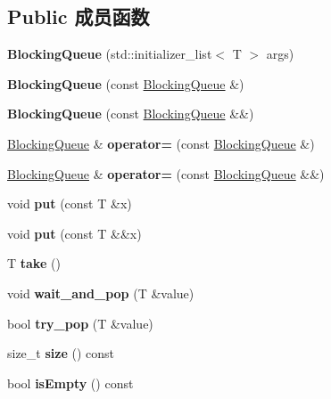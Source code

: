 \subsection*{Public 成员函数}
\begin{DoxyCompactItemize}
\item 
\mbox{\label{classBlockingQueue_a4d1bbabd0a1212ab77b3a24614b6b0c1}} 
{\bfseries Blocking\+Queue} (std\+::initializer\+\_\+list$<$ T $>$ args)
\item 
\mbox{\label{classBlockingQueue_a2f2b1e4d887d77a81fddabd44c5cdbfd}} 
{\bfseries Blocking\+Queue} (const \hyperlink{classBlockingQueue}{Blocking\+Queue} \&)
\item 
\mbox{\label{classBlockingQueue_ab7dbc308989dda7bef2f884a2703c806}} 
{\bfseries Blocking\+Queue} (const \hyperlink{classBlockingQueue}{Blocking\+Queue} \&\&)
\item 
\mbox{\label{classBlockingQueue_aaee07bb9044a01b4cb0af75748795325}} 
\hyperlink{classBlockingQueue}{Blocking\+Queue} \& {\bfseries operator=} (const \hyperlink{classBlockingQueue}{Blocking\+Queue} \&)
\item 
\mbox{\label{classBlockingQueue_abbe4440d6ed06d175925bba1f3c02312}} 
\hyperlink{classBlockingQueue}{Blocking\+Queue} \& {\bfseries operator=} (const \hyperlink{classBlockingQueue}{Blocking\+Queue} \&\&)
\item 
\mbox{\label{classBlockingQueue_a1c824f8d644951d25bed9825794ddeae}} 
void {\bfseries put} (const T \&x)
\item 
\mbox{\label{classBlockingQueue_acedd6887a4af752440fb2dcd04292fa3}} 
void {\bfseries put} (const T \&\&x)
\item 
\mbox{\label{classBlockingQueue_aac788baea510940fc40961a285bacc5f}} 
T {\bfseries take} ()
\item 
\mbox{\label{classBlockingQueue_a8efc43c38666a38402c39f772da63fcf}} 
void {\bfseries wait\+\_\+and\+\_\+pop} (T \&value)
\item 
\mbox{\label{classBlockingQueue_a47a2d7726112b4e2d7b3f65a4e84aa06}} 
bool {\bfseries try\+\_\+pop} (T \&value)
\item 
\mbox{\label{classBlockingQueue_a733361d5721c6ba64af3e129921c43b0}} 
size\+\_\+t {\bfseries size} () const
\item 
\mbox{\label{classBlockingQueue_acec723bb67906e85da1999f9072eb0c8}} 
bool {\bfseries is\+Empty} () const
\end{DoxyCompactItemize}


